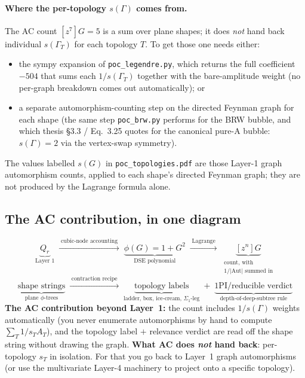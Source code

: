 \documentclass[11pt,a4paper]{article}
\begin{document}
\paragraph{Where the per-topology $s(\Gamma)$ comes from.}
The AC count $[z^7]G=5$ is a sum over plane shapes; it does \emph{not} hand
back individual $s(\Gamma_T)$ for each topology $T$. To get those one needs
either:
\begin{itemize}[leftmargin=2em,itemsep=1pt]
  \item the sympy expansion of \texttt{poc\_legendre.py}, which returns the full
        coefficient $-504$ that sums each $1/s(\Gamma_T)$ together with the
        bare-amplitude weight (no per-graph breakdown comes out automatically); or
  \item a separate automorphism-counting step on the directed Feynman graph for
        each shape (the same step \texttt{poc\_brw.py} performs for the BRW bubble,
        and which thesis \S3.3 / Eq.~3.25 quotes for the canonical pure-A bubble:
        $s(\Gamma)=2$ via the vertex-swap symmetry).
\end{itemize}
The values labelled $s(G)$ in \texttt{poc\_topologies.pdf} are those Layer-1
graph automorphism counts, applied to each shape's directed Feynman graph;
they are not produced by the Lagrange formula alone.

\subsection{The AC contribution, in one diagram}

\[
\underbrace{Q_r}_{\text{Layer 1}}
\;\xrightarrow{\;\text{cubic-node accounting}\;}\;
\underbrace{\phi(G) = 1+G^2}_{\text{DSE polynomial}}
\;\xrightarrow{\;\text{Lagrange}\;}\;
\underbrace{[z^n]G}_{\substack{\text{count, with}\\1/|\mathrm{Aut}|\text{ summed in}}}
\]
\[
\underbrace{\text{shape strings}}_{\text{plane }\phi\text{-trees}}
\;\xrightarrow{\;\text{contraction recipe}\;}\;
\underbrace{\text{topology labels}}_{\text{ladder, box, ice-cream, } \Sigma_1\text{-leg}}
\;+\;\underbrace{\text{1PI/reducible verdict}}_{\text{depth-of-deep-subtree rule}}
\]
\textbf{The AC contribution beyond Layer~1:} the count includes $1/s(\Gamma)$
weights automatically (you never enumerate automorphisms by hand to compute
$\sum_T 1/s_T A_T$), and the topology label $+$ relevance verdict are read
off the shape string without drawing the graph. \textbf{What AC does \emph{not}
hand back}: per-topology $s_T$ in isolation. For that you go back to Layer~1
graph automorphisms (or use the multivariate Layer-4 machinery to project
onto a specific topology).
\end{document}
